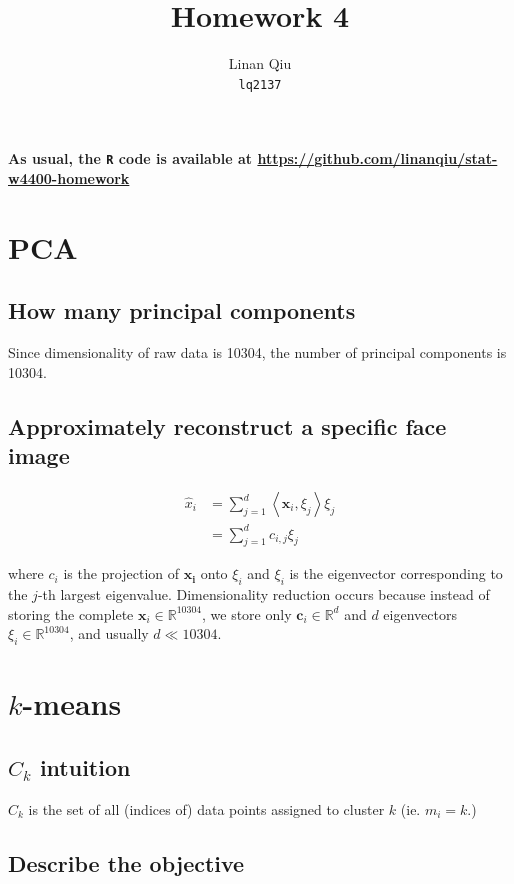 \documentclass[11pt]{scrartcl}
\title{Homework 4}
\author{Linan Qiu\\\texttt{lq2137}}
\newcommand{\km}{$k$-means}
\begin{document}
\maketitle

\textbf{As usual, the \texttt{R} code is available at \url{https://github.com/linanqiu/stat-w4400-homework}}

\section{PCA}

\subsection{How many principal components}

Since dimensionality of raw data is 10304, the number of principal components is 10304.

\subsection{Approximately reconstruct a specific face image}

\begin{align*}
\hat{x}_i &= \sum_{j=1}^d \left<\mathbf{x}_i,\xi_j \right> \xi_j\\
&=\sum_{j=1}^d c_{i,j} \xi_j
\end{align*}

where $c_i$ is the projection of $\mathbf{x_i}$ onto $\xi_i$ and $\xi_i$ is the eigenvector corresponding to the $j$-th largest eigenvalue. Dimensionality reduction occurs because instead of storing the complete $\mathbf{x}_i \in \mathbb{R}^{10304}$, we store only $\mathbf{c}_i \in \mathbb{R}^d$ and $d$ eigenvectors $\xi_i \in \mathbb{R}^{10304}$, and usually $d \ll 10304$.

\section{\km}

\subsection{$C_k$ intuition}

$C_k$ is the set of all (indices of) data points assigned to cluster $k$ (ie. $m_i = k$.)

\subsection{Describe the objective}
\end{document}
